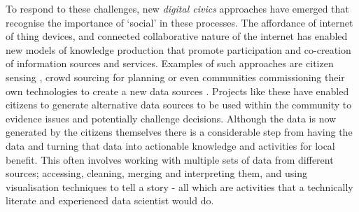 To respond to these challenges, new \textit{digital civics} \citep{olivier_digital_2015} approaches have emerged that recognise the importance of `social' in these processes. The affordance of internet of thing devices, and connected collaborative nature of the internet has enabled new models of knowledge production that promote participation and co-creation of information sources and services. Examples of such approaches are citizen sensing \citep{balestrini_city_2017,gabrys_programming_2014}, crowd sourcing for planning \citep{maskell_spokespeople:_2018,le_dantec_planning_2015} or even communities commissioning their own technologies to create a new data sources \citep{garbett_app_2016}. Projects like these have enabled citizens to generate alternative data sources to be used within the community to evidence issues and potentially challenge decisions. Although the data is now generated by the citizens themselves there is a considerable step from having the data and turning that data into actionable knowledge and activities for local benefit. This often involves working with multiple sets of data from different sources; accessing, cleaning, merging and interpreting them, and using visualisation techniques to tell a story - all which are activities that a technically literate and experienced data scientist would do.


